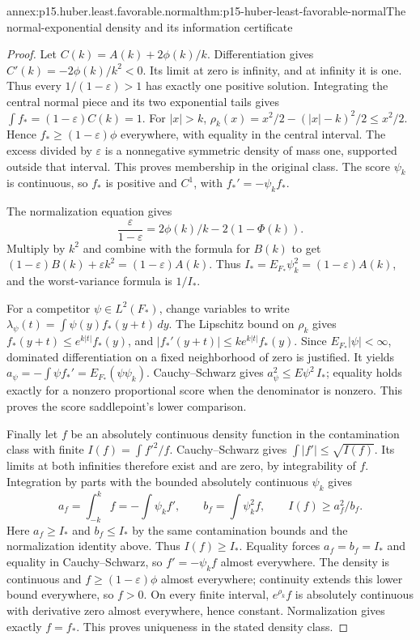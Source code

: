 \begin{annexitem}{annex:p15.huber.least.favorable.normal}{thm:p15-huber-least-favorable-normal}{The normal-exponential density and its information certificate}
\begin{proof}
Let \(C(k)=A(k)+2\phi(k)/k\). Differentiation gives
\(C'(k)=-2\phi(k)/k^2<0\).
Its limit at zero is infinity, and at infinity it is one.
Thus every \(1/(1-\varepsilon)>1\) has exactly one positive solution.
Integrating the central normal piece and its two exponential tails
gives \(\int f_*=(1-\varepsilon)C(k)=1\).
For \(|x|>k\),
\(\rho_k(x)=x^2/2-(|x|-k)^2/2\leq x^2/2\).
Hence \(f_*\geq(1-\varepsilon)\phi\) everywhere, with equality in
the central interval. The excess divided by \(\varepsilon\) is
a nonnegative symmetric density of mass one, supported outside
that interval. This proves membership in the original class.
The score \(\psi_k\) is continuous, so \(f_*\) is positive and \(C^1\),
with \(f_*'=-\psi_k f_*\).

The normalization equation gives
\[
 \frac{\varepsilon}{1-\varepsilon}
       =2\phi(k)/k-2(1-\Phi(k)).
\]
Multiply by \(k^2\) and combine with the formula for \(B(k)\) to get
\((1-\varepsilon)B(k)+\varepsilon k^2=(1-\varepsilon)A(k)\).
Thus \(I_*=E_{F_*}\psi_k^2=(1-\varepsilon)A(k)\), and the
worst-variance formula is \(1/I_*\).

For a competitor \(\psi\in L^2(F_*)\), change variables to write
\(\lambda_\psi(t)=\int\psi(y)f_*(y+t)\,dy\).
The Lipschitz bound on \(\rho_k\) gives
\(f_*(y+t)\leq e^{k|t|}f_*(y)\), and
\(|f_*'(y+t)|\leq k e^{k|t|}f_*(y)\).
Since \(E_{F_*}|\psi|<\infty\), dominated differentiation on a fixed
neighborhood of zero is justified. It yields
\(a_\psi=-\int\psi f_*'=E_{F_*}(\psi\psi_k)\).
Cauchy--Schwarz gives \(a_\psi^2\leq E\psi^2\,I_*\);
equality holds exactly for a nonzero proportional score when
the denominator is nonzero. This proves the score saddlepoint's
lower comparison.

Finally let \(f\) be an absolutely continuous density function in
the contamination class with finite \(I(f)=\int f'^2/f\).
Cauchy--Schwarz gives \(\int|f'|\leq\sqrt{I(f)}\).
Its limits at both infinities therefore exist and are zero, by
integrability of \(f\). Integration by parts with the bounded
absolutely continuous \(\psi_k\) gives
\[
 a_f=\int_{-k}^kf=-\int\psi_k f',\qquad
 b_f=\int\psi_k^2f,\qquad I(f)\geq a_f^2/b_f .
\]
Here \(a_f\geq I_*\) and \(b_f\leq I_*\) by the same contamination
bounds and the normalization identity above. Thus \(I(f)\geq I_*\).
Equality forces \(a_f=b_f=I_*\) and equality in Cauchy--Schwarz,
so \(f'=-\psi_k f\) almost everywhere.
The density is continuous and \(f\geq(1-\varepsilon)\phi\) almost
everywhere; continuity extends this lower bound everywhere, so \(f>0\).
On every finite interval, \(e^{\rho_k}f\) is absolutely continuous
with derivative zero almost everywhere, hence constant.
Normalization gives exactly \(f=f_*\). This proves uniqueness in
the stated density class.
\end{proof}
\end{annexitem}

